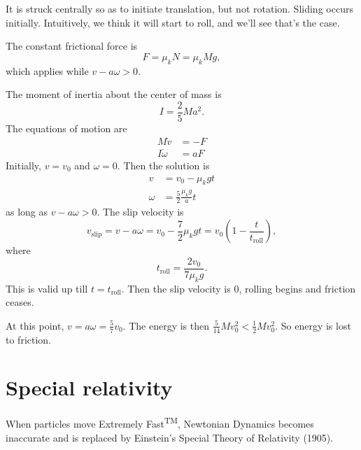 \documentclass[a4paper]{article}
\begin{document}
\begin{eg}\leavevmode
  \begin{center}
  \end{center}
  It is struck centrally so as to initiate translation, but not rotation. Sliding occurs initially. Intuitively, we think it will start to roll, and we'll see that's the case.

  The constant frictional force is
  \[
    F = \mu_k N = \mu_k Mg,
  \]
  which applies while $v - a\omega > 0$.

  The moment of inertia about the center of mass is
  \[
    I = \frac{2}{5}Ma^2.
  \]
  The equations of motion are
  \begin{align*}
    M\dot{v} &= -F\\
    I\dot\omega &= aF
  \end{align*}
  Initially, $v = v_0$ and $\omega = 0$. Then the solution is
  \begin{align*}
    v &= v_0 - \mu_k gt\\
    \omega &= \frac{5}{2} \frac{\mu_k g}{a}t
  \end{align*}
  as long as $v - a \omega > 0$. The slip velocity is
  \[
    v_{\mathrm{slip}} = v - a\omega = v_0 - \frac{7}{2}\mu_k gt = v_0 \left(1 - \frac{t}{t_\mathrm{roll}}\right),
  \]
  where
  \[
    t_{\mathrm{roll}} = \frac{2v_0}{7\mu_k g}.
  \]
  This is valid up till $t = t_{\mathrm{roll}}$. Then the slip velocity is 0, rolling begins and friction ceases.

  At this point, $v = a\omega = \frac{5}{7}v_0$. The energy is then $\frac{5}{14}Mv_0^2 < \frac{1}{2}Mv_0^2$. So energy is lost to friction.
\end{eg}
\section{Special relativity}
When particles move Extremely Fast\textsuperscript{TM}, Newtonian Dynamics becomes inaccurate and is replaced by Einstein's Special Theory of Relativity (1905).
\end{document}
